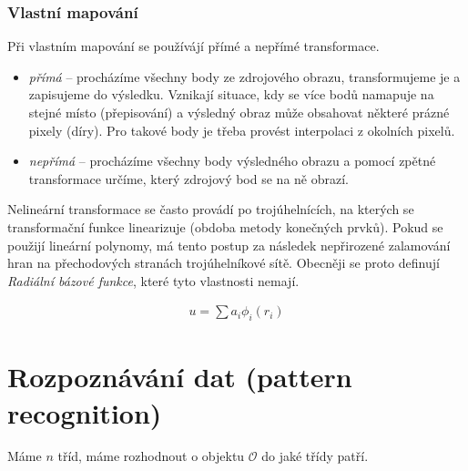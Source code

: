 \subsubsection{Vlastní mapování}
Při vlastním mapování se používájí přímé a nepřímé transformace.

\begin{itemize}
\item {\em přímá} -- procházíme všechny body ze zdrojového obrazu, transformujeme je a zapisujeme do výsledku. 
Vznikají situace, kdy se více bodů namapuje na stejné místo (přepisování) a výsledný obraz může obsahovat některé
prázné pixely (díry). Pro takové body je třeba provést interpolaci z okolních pixelů.

\item {\em nepřímá} -- procházíme všechny body výsledného obrazu a pomocí zpětné transformace určíme, který zdrojový bod
se na ně obrazí.
\end{itemize}

Nelineární transformace se často provádí po trojúhelnících, na kterých se transformační funkce linearizuje 
(obdoba metody konečných prvků).
Pokud se použijí lineární polynomy, má tento postup za následek nepřirozené zalamování hran na přechodových stranách
trojúhelníkové sítě. Obecněji se proto definují {\em Radiální bázové funkce}, které tyto vlastnosti nemají.

\begin{eqnarray}
u=\sum a_i\phi_i(r_i)
\end{eqnarray}




\section{Rozpoznávání dat (pattern recognition)}
Máme $n$ tříd, máme rozhodnout o objektu $\mathcal{O}$ do jaké třídy patří.

